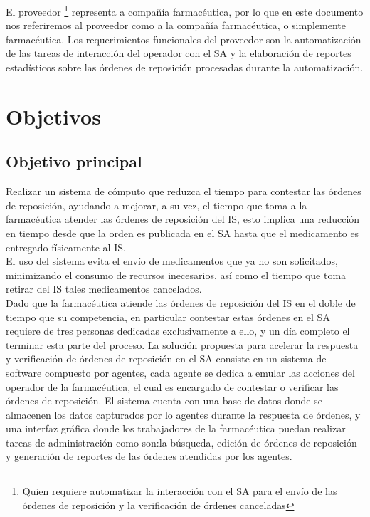 El proveedor \footnote{Quien requiere automatizar la interacción con el SA para el envío de las órdenes de reposición y la verificación de órdenes canceladas} representa a compañía farmacéutica, por lo que en este documento nos referiremos al proveedor como a la compañía farmacéutica, o simplemente farmacéutica. Los requerimientos funcionales del proveedor son la automatización de las tareas de interacción del operador con el SA y la elaboración de reportes estadísticos sobre las órdenes de reposición procesadas durante la automatización.

\section{Objetivos}
\subsection{Objetivo principal}
Realizar un sistema de cómputo que reduzca el tiempo para contestar las órdenes de reposición, ayudando a mejorar, a su vez, el tiempo que toma a la farmacéutica atender las órdenes de reposición del IS, esto implica una reducción en tiempo desde que la orden es publicada en el SA hasta que el medicamento es entregado físicamente al IS.\\
El uso del sistema evita el envío de medicamentos que ya no son solicitados, minimizando el consumo de recursos inecesarios, así como el tiempo que toma retirar del IS tales medicamentos cancelados.\\
Dado que la farmacéutica atiende las órdenes de reposición del IS en el doble de tiempo que su competencia, en particular contestar estas órdenes en el SA requiere de tres personas dedicadas exclusivamente a ello, y un día completo el terminar esta parte del proceso. La solución propuesta para acelerar la respuesta y verificación de órdenes de reposición en el SA consiste en un sistema de software compuesto por agentes, cada agente se dedica a emular las acciones del operador de la farmacéutica, el cual es encargado de contestar o verificar las órdenes de reposición. El sistema cuenta con una base de datos donde se almacenen los datos capturados por lo agentes durante la respuesta de órdenes, y una interfaz gráfica donde los trabajadores de la farmacéutica puedan realizar tareas de administración como son:la búsqueda, edición de órdenes de reposición y generación de reportes de las órdenes atendidas por los agentes.
